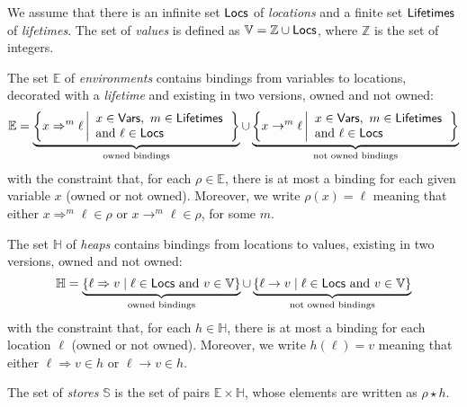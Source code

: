 \begin{definition}
  We assume that there is an infinite set $\mathsf{Locs}$ of \emph{locations}
  and a finite set $\mathsf{Lifetimes}$ of \emph{lifetimes}.
  The set of \emph{values} is defined as $\mathbb{V}=\mathbb{Z}\cup\mathsf{Locs}$,
  where $\mathbb{Z}$ is the set of integers.

  The set $\mathbb{E}$
  of \emph{environments} contains bindings from variables to locations,
  decorated with a \emph{lifetime} and existing in two versions, owned
  and not owned:
  \[
  \mathbb{E}=
  \underbrace{\left\{x\Rightarrow^m\ell\left|\begin{array}{l}
  x\in\mathsf{Vars},\ m\in\mathsf{Lifetimes}\\
  \text{and }\ell\in\mathsf{Locs}
  \end{array}\right.\right\}}_{\text{owned bindings}}
  \cup
  \underbrace{\left\{x\rightarrow^m\ell\left|\begin{array}{l}
  x\in\mathsf{Vars},\ m\in\mathsf{Lifetimes}\\
  \text{and }\ell\in\mathsf{Locs}
  \end{array}\right.\right\}}_{\text{not owned bindings}}
  \]
  with the constraint that, for each $\rho\in\mathbb{E}$, there is at most a binding for each
  given variable $x$ (owned or not owned). Moreover, we write $\rho(x)=\ell$ meaning that
  either $x\Rightarrow^m\ell\in\rho$ or $x\rightarrow^m\ell\in\rho$, for some $m$.

  The set $\mathbb{H}$ of \emph{heaps} contains bindings from locations to values,
  existing in two versions, owned and not owned:
  \[
  \mathbb{H}=
  \underbrace{\{\ell\Rightarrow v\mid\ell\in\mathsf{Locs}\text{ and }v\in\mathbb{V}\}}_{\text{owned bindings}}
  \cup
  \underbrace{\{\ell\rightarrow v\mid\ell\in\mathsf{Locs}\text{ and }v\in\mathbb{V}\}}_{\text{not owned bindings}}
  \]
  with the constraint that, for each $h\in\mathbb{H}$, there is at most a binding for each
  location $\ell$ (owned or not owned). Moreover, we write $h(\ell)=v$ meaning that
  either $\ell\Rightarrow v\in h$ or $\ell\rightarrow v\in h$.

  The set of \emph{stores} $\mathbb{S}$ is the set of pairs
  $\mathbb{E}\times\mathbb{H}$, whose elements are written as $\rho\star h$.
\end{definition}
